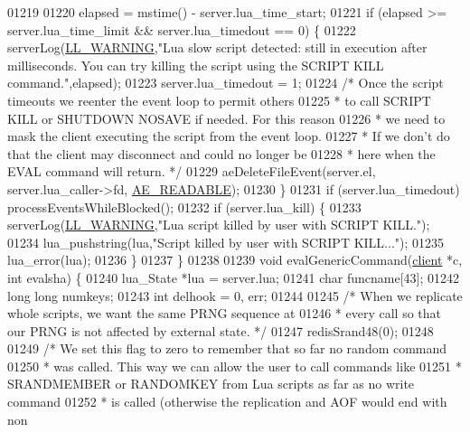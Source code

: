 \begin{DoxyCode}
{{{{{{{{{{{01219 
01220     elapsed = mstime() - server.lua\_time\_start;
01221     \textcolor{keywordflow}{if} (elapsed >= server.lua\_time\_limit && server.lua\_timedout == 0) \{
01222         serverLog(\hyperlink{server_8h_a31229b9334bba7d6be2a72970967a14b}{LL\_WARNING},\textcolor{stringliteral}{"Lua slow script detected: still in execution after %
       milliseconds. You can try killing the script using the SCRIPT KILL command."},elapsed);
01223         server.lua\_timedout = 1;
01224         \textcolor{comment}{/* Once the script timeouts we reenter the event loop to permit others}
01225 \textcolor{comment}{         * to call SCRIPT KILL or SHUTDOWN NOSAVE if needed. For this reason}
01226 \textcolor{comment}{         * we need to mask the client executing the script from the event loop.}
01227 \textcolor{comment}{         * If we don't do that the client may disconnect and could no longer be}
01228 \textcolor{comment}{         * here when the EVAL command will return. */}
01229          aeDeleteFileEvent(server.el, server.lua\_caller->fd, \hyperlink{ae_8h_a7a9a2162d007d09739955b4e55c65bf3}{AE\_READABLE});
01230     \}
01231     \textcolor{keywordflow}{if} (server.lua\_timedout) processEventsWhileBlocked();
01232     \textcolor{keywordflow}{if} (server.lua\_kill) \{
01233         serverLog(\hyperlink{server_8h_a31229b9334bba7d6be2a72970967a14b}{LL\_WARNING},\textcolor{stringliteral}{"Lua script killed by user with SCRIPT KILL."});
01234         lua\_pushstring(lua,\textcolor{stringliteral}{"Script killed by user with SCRIPT KILL..."});
01235         lua\_error(lua);
01236     \}
01237 \}
01238 
01239 \textcolor{keywordtype}{void} evalGenericCommand(\hyperlink{structclient}{client} *c, \textcolor{keywordtype}{int} evalsha) \{
01240     lua\_State *lua = server.lua;
01241     \textcolor{keywordtype}{char} funcname[43];
01242     \textcolor{keywordtype}{long} \textcolor{keywordtype}{long} numkeys;
01243     \textcolor{keywordtype}{int} delhook = 0, err;
01244 
01245     \textcolor{comment}{/* When we replicate whole scripts, we want the same PRNG sequence at}
01246 \textcolor{comment}{     * every call so that our PRNG is not affected by external state. */}
01247     redisSrand48(0);
01248 
01249     \textcolor{comment}{/* We set this flag to zero to remember that so far no random command}
01250 \textcolor{comment}{     * was called. This way we can allow the user to call commands like}
01251 \textcolor{comment}{     * SRANDMEMBER or RANDOMKEY from Lua scripts as far as no write command}
01252 \textcolor{comment}{     * is called (otherwise the replication and AOF would end with non}
}}}}}}}}}}}
\end{DoxyCode}
